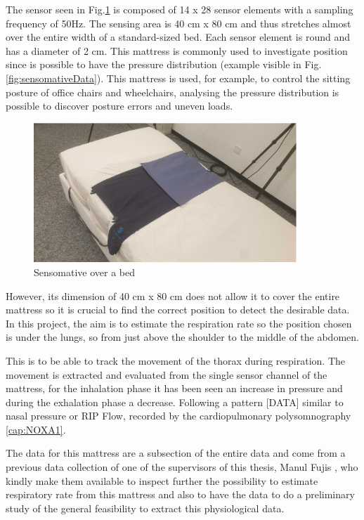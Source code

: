 The sensor seen in Fig.\ref{fig:sensomativeBed} is composed of 14 x 28 sensor elements with a sampling frequency of 50Hz. 
The sensing area is 40 cm x 80 cm and thus stretches almost over the entire width of a standard-sized bed. Each sensor element is round and has a diameter of 2 cm.
This mattress is commonly used to investigate position since is possible to have the pressure distribution (example visible in Fig.\ref{fig:sensomativeData}). This mattress is used, for example, to control the sitting posture of office chairs and wheelchairs, analysing the pressure distribution is possible to discover posture errors and uneven loads.\\

\vspace*{0.5cm}
\begin{figure}[H]
    \centering
    \includegraphics[width=0.9\textwidth]{img/sensomative.png}
    \caption{Sensomative over a bed}
    \label{fig:sensomativeBed}
\end{figure}
\vspace*{0.5cm}

However, its dimension of 40 cm x 80 cm does not allow it to cover the entire mattress so it is crucial to find the correct position to detect the desirable data. In this project, the aim is to estimate the respiration rate so the position chosen is under the lungs, so from just above the shoulder to the middle of the abdomen.

This is to be able to track the movement of the thorax during respiration. The movement is extracted and evaluated from the single sensor channel of the mattress, for the inhalation phase it has been seen an increase in pressure and during the exhalation phase a decrease. Following a pattern [DATA] similar to nasal pressure or RIP Flow, recorded by the cardiopulmonary polysomnography \ref{cap:NOXA1}. 

The data for this mattress are a subsection of the entire data and come from a previous data collection of one of the supervisors of this thesis, Manul Fujis \cite{ManuelZurich}, who kindly make them available to inspect further the possibility to estimate respiratory rate from this mattress and also to have the data to do a preliminary study of the general feasibility to extract this physiological data. 



